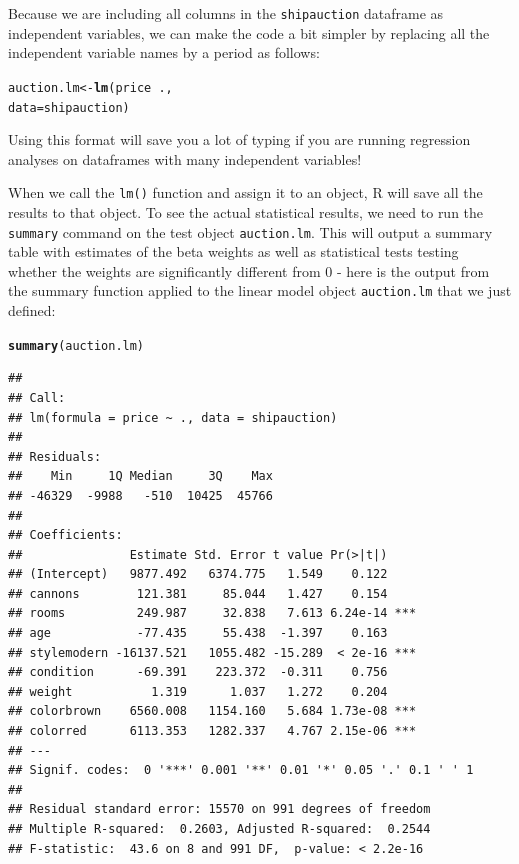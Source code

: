 \documentclass{tufte-book}\usepackage[]{graphicx}\usepackage[]{color}
\makeatletter
\newcommand{\hlopt}[1]{\textcolor[rgb]{0,0,0}{#1}}%
\newcommand{\hlstd}[1]{\textcolor[rgb]{0.345,0.345,0.345}{#1}}%
\newcommand{\hlkwb}[1]{\textcolor[rgb]{0.69,0.353,0.396}{#1}}%
\newcommand{\hlkwc}[1]{\textcolor[rgb]{0.333,0.667,0.333}{#1}}%
\newcommand{\hlkwd}[1]{\textcolor[rgb]{0.737,0.353,0.396}{\textbf{#1}}}%
\newenvironment{kframe}{%
 \def\at@end@of@kframe{}%
 \ifinner\ifhmode%
  \def\at@end@of@kframe{\end{minipage}}%
  \begin{minipage}{\columnwidth}%
 \fi\fi%
 \def\FrameCommand##1{\hskip\@totalleftmargin \hskip-\fboxsep
 \colorbox{shadecolor}{##1}\hskip-\fboxsep
     \hskip-\linewidth \hskip-\@totalleftmargin \hskip\columnwidth}%
 \MakeFramed {\advance\hsize-\width
   \@totalleftmargin\z@ \linewidth\hsize
   \@setminipage}}%
 {\par\unskip\endMakeFramed%
 \at@end@of@kframe}
\newenvironment{knitrout}{}{} %
\makeatother
\begin{document}
\begin{marginfigure}

Because we are including all columns in the \texttt{shipauction} dataframe as independent variables, we can make the code a bit simpler by replacing all the independent variable names by a period as follows:

\begin{knitrout}
\color{fgcolor}\begin{kframe}
\begin{alltt}
\hlstd{auction.lm} \hlkwb{<-} \hlkwd{lm}\hlstd{(price} \hlopt{~} \hlstd{.,}
                 \hlkwc{data} \hlstd{= shipauction)}
\end{alltt}
\end{kframe}
\end{knitrout}

Using this format will save you a lot of typing if you are running regression analyses on dataframes with many independent variables!

\end{marginfigure}

When we call the \texttt{lm()} function and assign it to an object, R will save all the results to that object. To see the actual statistical results, we need to run the \texttt{summary} command on the test object \texttt{auction.lm}. This will output a summary table with estimates of the beta weights as well as statistical tests testing whether the weights are significantly different from 0 - here is the output from the summary function applied to the linear model object \texttt{auction.lm} that we just defined:

\begin{knitrout}
\color{fgcolor}\begin{kframe}
\begin{alltt}
\hlkwd{summary}\hlstd{(auction.lm)}
\end{alltt}
\begin{verbatim}
## 
## Call:
## lm(formula = price ~ ., data = shipauction)
## 
## Residuals:
##    Min     1Q Median     3Q    Max 
## -46329  -9988   -510  10425  45766 
## 
## Coefficients:
##               Estimate Std. Error t value Pr(>|t|)    
## (Intercept)   9877.492   6374.775   1.549    0.122    
## cannons        121.381     85.044   1.427    0.154    
## rooms          249.987     32.838   7.613 6.24e-14 ***
## age            -77.435     55.438  -1.397    0.163    
## stylemodern -16137.521   1055.482 -15.289  < 2e-16 ***
## condition      -69.391    223.372  -0.311    0.756    
## weight           1.319      1.037   1.272    0.204    
## colorbrown    6560.008   1154.160   5.684 1.73e-08 ***
## colorred      6113.353   1282.337   4.767 2.15e-06 ***
## ---
## Signif. codes:  0 '***' 0.001 '**' 0.01 '*' 0.05 '.' 0.1 ' ' 1
## 
## Residual standard error: 15570 on 991 degrees of freedom
## Multiple R-squared:  0.2603,	Adjusted R-squared:  0.2544 
## F-statistic:  43.6 on 8 and 991 DF,  p-value: < 2.2e-16
\end{verbatim}
\end{kframe}
\end{knitrout}
\end{document}
